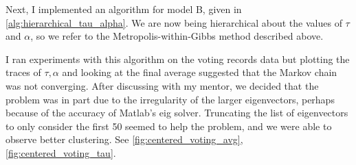 \documentclass{siamart1116}
\begin{document}
Next, I implemented an algorithm for model B, given in \cref{alg:hierarchical_tau_alpha}. We are now being hierarchical about the values of $\tau$ and $\alpha$, so we refer to the Metropolis-within-Gibbs method described above.

I ran experiments with this algorithm on the voting records data but plotting the traces of $\tau, \alpha$ and looking at the final average suggested that the Markov chain was not converging. After discussing with my mentor, we decided that the problem was in part due to the irregularity of the larger eigenvectors, perhaps because of the accuracy of Matlab's eig solver. Truncating the list of eigenvectors to only consider the first 50 seemed to help the problem, and we were able to observe better clustering. See \cref{fig:centered_voting_avg}, \cref{fig:centered_voting_tau}.
\end{document}
